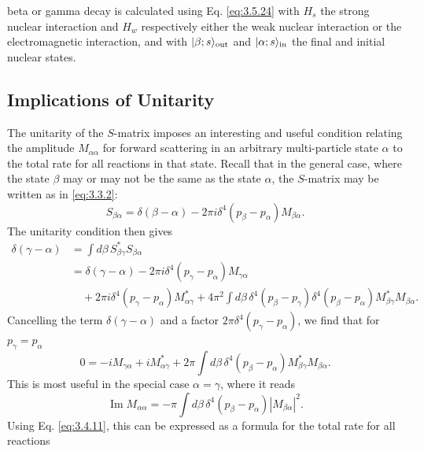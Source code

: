 beta or gamma decay is calculated using Eq. \eqref{eq:3.5.24} with $H_s$ the strong nuclear interaction
and $H_w$ respectively either the weak nuclear interaction or the electromagnetic interaction,
and with $\lvert \beta;s\rangle_{\mathrm{out}}$ and $\lvert \alpha;s\rangle_{\mathrm{in}}$ the final and initial
nuclear states.

\subsection{Implications of Unitarity}

The unitarity of the $S$-matrix imposes an interesting and useful condition relating the amplitude
$M_{\alpha\alpha}$ for forward scattering in an arbitrary multi-particle state $\alpha$ to the
total rate for all reactions in that state. Recall that in the general case, where the state
$\beta$ may or may not be the same as the state $\alpha$, the $S$-matrix may be written as in
\eqref{eq:3.3.2}:
\[
 S_{\beta\alpha}=\delta(\beta-\alpha)-2\pi i\delta^4(p_\beta-p_\alpha)M_{\beta\alpha}.
\]
The unitarity condition then gives
\begin{align*}
 \delta(\gamma-\alpha)&=\int d\beta\,S^*_{\beta\gamma}S_{\beta\alpha}\\
 &=\delta(\gamma-\alpha)-2\pi i\delta^4(p_\gamma-p_\alpha)M_{\gamma\alpha}\\
 &\quad+2\pi i\delta^4(p_\gamma-p_\alpha)M^*_{\alpha\gamma}
 +4\pi^2\int d\beta\,\delta^4(p_\beta-p_\gamma)
 \delta^4(p_\beta-p_\alpha)M^*_{\beta\gamma}M_{\beta\alpha}.
\end{align*}
Cancelling the term $\delta(\gamma-\alpha)$ and a factor
$2\pi\delta^4(p_\gamma-p_\alpha)$, we find that for $p_\gamma=p_\alpha$
\begin{equation}
 0=-iM_{\gamma\alpha}+iM^*_{\alpha\gamma}
 +2\pi\int d\beta\,\delta^4(p_\beta-p_\alpha)M^*_{\beta\gamma}M_{\beta\alpha}.
 \tag{3.6.1}\label{eq:3.6.1}
\end{equation}
This is most useful in the special case $\alpha=\gamma$, where it reads
\begin{equation}
 \operatorname{Im}M_{\alpha\alpha}
 =-\pi\int d\beta\,\delta^4(p_\beta-p_\alpha)|M_{\beta\alpha}|^2.
 \tag{3.6.2}\label{eq:3.6.2}
\end{equation}
Using Eq. \eqref{eq:3.4.11}, this can be expressed as a formula for the total rate for all reactions

